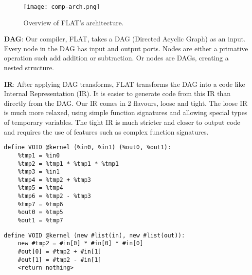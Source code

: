     \begin{figure}[h!]
    \begin{center}
        \texttt{[image: comp-arch.png]}
        \caption{Overview of FLAT's architecture.}
        \label{fig:arch}
    \end{center}
\end{figure}

\textbf{DAG}: Our compiler, FLAT, takes a DAG (Directed Acyclic Graph) as an input.
Every node in the DAG has input and output ports.
Nodes are either a primative operation such add addition or subtraction.
Or nodes are DAGs, creating a nested structure. 

\textbf{IR}: After applying DAG transforms, FLAT transforms the DAG into a code like Internal Representation (IR).
It is easier to generate code from this IR than directly from the DAG.
Our IR comes in 2 flavours, loose and tight.
The loose IR is much more relaxed, using simple function signatures and allowing special types of temporary variables.
The tight IR is much stricter and closer to output code and requires the use of features such as complex function signatures.

\newsavebox{\looseIRlisting}
\begin{lrbox}{\looseIRlisting}%
\begin{lstlisting}
define VOID @kernel (%in0, %in1) (%out0, %out1):
	%tmp1 = %in0
	%tmp2 = %tmp1 * %tmp1 * %tmp1
	%tmp3 = %in1
	%tmp4 = %tmp2 + %tmp3
	%tmp5 = %tmp4
	%tmp6 = %tmp2 - %tmp3
	%tmp7 = %tmp6
	%out0 = %tmp5
	%out1 = %tmp7
\end{lstlisting}
\endminipage
\end{lrbox}



\newsavebox{\tightIRlisting}
\begin{lrbox}{\tightIRlisting}%
\begin{lstlisting}
define VOID @kernel (new #list(in), new #list(out)):
	new #tmp2 = #in[0] * #in[0] * #in[0]
	#out[0] = #tmp2 + #in[1]
	#out[1] = #tmp2 - #in[1]
	<return nothing>
\end{lstlisting}
\endminipage
\end{lrbox}

